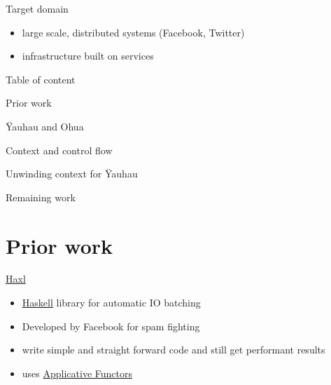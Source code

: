 \begin{frame}{Target domain}

\begin{itemize}[<+->]
\tightlist
\item
  large scale, distributed systems (Facebook, Twitter)
\item
  infrastructure built on services
\end{itemize}

\end{frame}

\begin{frame}{Table of content}

Prior work

Ÿauhau and Ohua

Context and control flow

Unwinding context for Ÿauhau

Remaining work

\end{frame}

\section{Prior work}\label{prior-work}

\begin{frame}[fragile]{\href{https://hackage.haskell.org/package/haxl}{Haxl}}

\begin{Shaded}
\begin{Highlighting}[]
  \OtherTok{->}  \OtherTok{->}  \NormalTok{[}\NormalTok{]}
\FunctionTok{=} \FunctionTok{<$>} \FunctionTok{<*>} 

  \OtherTok{->}  \NormalTok{[}\NormalTok{]}
\FunctionTok{=}  
\end{Highlighting}
\end{Shaded}

\begin{itemize}[<+->]
\tightlist
\item
  \href{https://haskell.org}{Haskell} library for automatic IO batching
\item
  Developed by Facebook for spam fighting
\item
  write simple and straight forward code and still get performant
  results
\item
  uses
  \href{https://hackage.haskell.org/package/base-4.9.0.0/docs/Control-Monad.html}{Applicative
  Functors}
\end{itemize}

\end{frame}

